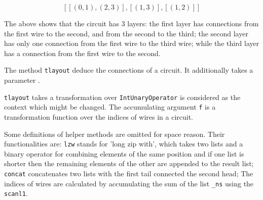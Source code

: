 $$[[(0,1),(2,3)],[(1,3)],[(1,2)]]$$

The above shows that the circuit has 3 layers: the first layer has connections
from the first wire to the second, and from the second to the third; the second
layer has only one connection from the first wire to the third wire; while the
third layer has a connection from the first wire to the second.

The method \texttt{tlayout} deduce the connections of a circuit. It additionally
takes a parameter \texttt{}.


\texttt{tlayout} takes a transformation over \texttt{IntUnaryOperator} is considered as the context which might be changed.
The accumulating argument \texttt{f} is a transformation function over the indices of wires in a circuit.

Some definitions of helper methods are omitted for space reason.
Their functionalities are: \texttt{lzw} stands for 'long zip with', which takes two lists and a binary operator for
combining elements of the same position and if one list is shorter then the
remaining elements of the other are appended to the result list; \texttt{concat}
concatenates two lists with the first tail connected the second head;
The indices of wires are calculated by accumulating the sum of the list \texttt{\_ns} using the \texttt{scanl1}.


